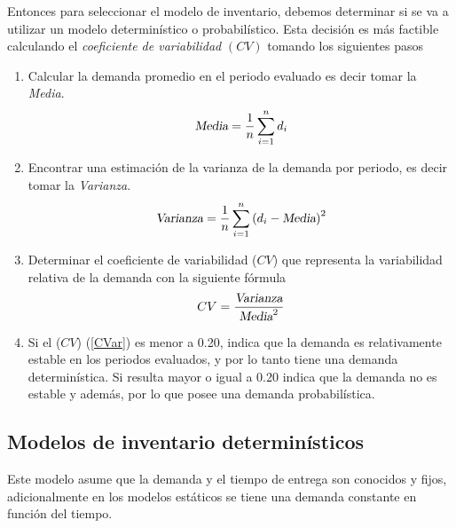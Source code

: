 Entonces para seleccionar el modelo de inventario, debemos determinar si se va a utilizar un modelo determinístico o probabilístico. Esta decisión es más factible calculando el \textsl{coeficiente de variabilidad} $(CV)$ tomando los siguientes pasos
\begin{enumerate}
	\item Calcular la demanda promedio en el periodo evaluado es decir tomar la \textsl{Media}.
	$$
	\textsl{Media}=\frac{1}{n}\sum\limits_{i = 1}^{n}{d}_{i}
	$$
	\item Encontrar una estimación de la varianza de la demanda por periodo, es decir tomar la \textsl{Varianza}.
	$$
	\textsl{Varianza}=\frac{1}{n}\sum\limits_{i = 1}^{n}{(d_i-\textsl{Media})}^2
	$$
	\item Determinar el coeficiente de variabilidad ($CV$) que representa la variabilidad relativa de la demanda con la siguiente fórmula
	\begin{equation}
	\label{CVar}
	CV = \frac{\textsl{Varianza}}{\textsl{Media}^2}
\end{equation}
	\item Si el ($CV$) (\ref{CVar}) es menor a 0.20, indica que la demanda es relativamente estable en los periodos evaluados, y por lo tanto tiene una demanda determinística. Si resulta mayor o igual a 0.20 indica que la demanda no es estable y además, por lo que posee una demanda probabilística.
\end{enumerate}



\subsection{Modelos de inventario determinísticos}

Este modelo asume que la demanda y el tiempo de entrega son conocidos y fijos, adicionalmente en los modelos estáticos se tiene una demanda constante en función del tiempo. \citep{taha2012investigacion}

